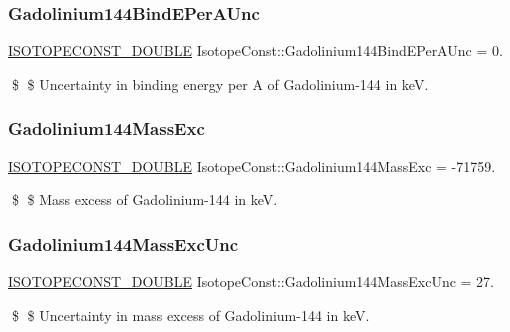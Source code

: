 \subsubsection{\texorpdfstring{Gadolinium144\+Bind\+E\+Per\+A\+Unc}{Gadolinium144BindEPerAUnc}}
{\footnotesize\ttfamily \mbox{\hyperlink{group___isotope_const-_macros_ga8f45a7272ce02c0b4c65c44636ed719a}{I\+S\+O\+T\+O\+P\+E\+C\+O\+N\+S\+T\+\_\+\+D\+O\+U\+B\+LE}} Isotope\+Const\+::\+Gadolinium144\+Bind\+E\+Per\+A\+Unc = 0.}

\$ \$ Uncertainty in binding energy per A of Gadolinium-\/144 in keV. \mbox{\label{group___isotope_const-_gadolinium-_gd144_ga1e4dd60707753a54fe88befcecbadc98}} 
\subsubsection{\texorpdfstring{Gadolinium144\+Mass\+Exc}{Gadolinium144MassExc}}
{\footnotesize\ttfamily \mbox{\hyperlink{group___isotope_const-_macros_ga8f45a7272ce02c0b4c65c44636ed719a}{I\+S\+O\+T\+O\+P\+E\+C\+O\+N\+S\+T\+\_\+\+D\+O\+U\+B\+LE}} Isotope\+Const\+::\+Gadolinium144\+Mass\+Exc = -\/71759.}

\$ \$ Mass excess of Gadolinium-\/144 in keV. \mbox{\label{group___isotope_const-_gadolinium-_gd144_gad61181e246020fb2e6fa7f9d9dd88e9c}} 
\subsubsection{\texorpdfstring{Gadolinium144\+Mass\+Exc\+Unc}{Gadolinium144MassExcUnc}}
{\footnotesize\ttfamily \mbox{\hyperlink{group___isotope_const-_macros_ga8f45a7272ce02c0b4c65c44636ed719a}{I\+S\+O\+T\+O\+P\+E\+C\+O\+N\+S\+T\+\_\+\+D\+O\+U\+B\+LE}} Isotope\+Const\+::\+Gadolinium144\+Mass\+Exc\+Unc = 27.}

\$ \$ Uncertainty in mass excess of Gadolinium-\/144 in keV. \mbox{\label{group___isotope_const-_gadolinium-_gd144_ga7f533272e14e131285dd468b190311ab}} 
